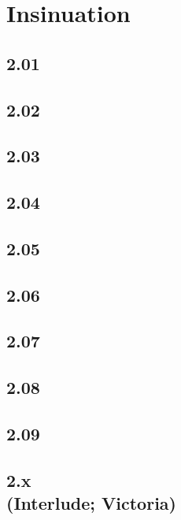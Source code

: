 \part{Insinuation}

\chapter{2.01}



\chapter{2.02}



\chapter{2.03}



\chapter{2.04}



\chapter{2.05}



\chapter{2.06}



\chapter{2.07}



\chapter{2.08}



\chapter{2.09}



\chapter[2.x (Interlude; Victoria)]{2.x\\(Interlude; Victoria)}

